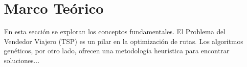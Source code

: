 \chapter{Marco Teórico}
\label{chap:marco_teorico}

En esta sección se exploran los conceptos fundamentales. El Problema del Vendedor Viajero (TSP) es un pilar en la optimización de rutas. Los algoritmos genéticos, por otro lado, ofrecen una metodología heurística para encontrar soluciones...